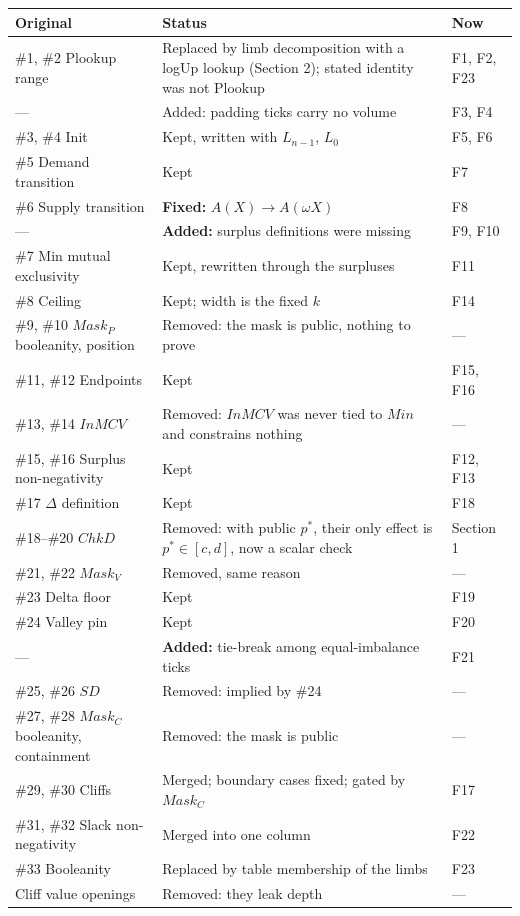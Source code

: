 \begin{longtable}[]{@{}lll@{}}
\toprule\noalign{}
Original & Status & Now \\
\midrule\noalign{}
\endhead
\bottomrule\noalign{}
\endlastfoot
\#1, \#2 Plookup range & Replaced by limb decomposition with a logUp lookup (Section 2); stated identity was not Plookup & F1, F2, F23 \\
--- & Added: padding ticks carry no volume & F3, F4 \\
\#3, \#4 Init & Kept, written with \(L_{n-1}\), \(L_0\) & F5, F6 \\
\#5 Demand transition & Kept & F7 \\
\#6 Supply transition & \textbf{Fixed:} \(A(X) \to A(\omega X)\) & F8 \\
--- & \textbf{Added:} surplus definitions were missing & F9, F10 \\
\#7 Min mutual exclusivity & Kept, rewritten through the surpluses & F11 \\
\#8 Ceiling & Kept; width is the fixed \(k\) & F14 \\
\#9, \#10 \(Mask_P\) booleanity, position & Removed: the mask is public, nothing to prove & --- \\
\#11, \#12 Endpoints & Kept & F15, F16 \\
\#13, \#14 \(InMCV\) & Removed: \(InMCV\) was never tied to \(Min\) and constrains nothing & --- \\
\#15, \#16 Surplus non-negativity & Kept & F12, F13 \\
\#17 \(\Delta\) definition & Kept & F18 \\
\#18--\#20 \(ChkD\) & Removed: with public \(p^*\), their only effect is \(p^* \in [c,d]\), now a scalar check & Section 1 \\
\#21, \#22 \(Mask_V\) & Removed, same reason & --- \\
\#23 Delta floor & Kept & F19 \\
\#24 Valley pin & Kept & F20 \\
--- & \textbf{Added:} tie-break among equal-imbalance ticks & F21 \\
\#25, \#26 \(SD\) & Removed: implied by \#24 & --- \\
\#27, \#28 \(Mask_C\) booleanity, containment & Removed: the mask is public & --- \\
\#29, \#30 Cliffs & Merged; boundary cases fixed; gated by \(Mask_C\) & F17 \\
\#31, \#32 Slack non-negativity & Merged into one column & F22 \\
\#33 Booleanity & Replaced by table membership of the limbs & F23 \\
Cliff value openings & Removed: they leak depth & --- \\
\end{longtable}

